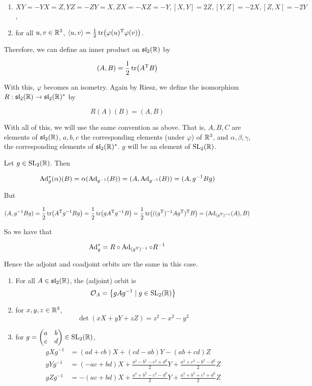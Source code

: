 \documentclass{article}
\renewcommand{\sl}{\mfs\mfl}
\begin{document}
\begin{lemma}
    \begin{enumerate}
        \item \(XY = -YX = Z, YZ = -ZY = X, ZX = -XZ = -Y, [X, Y] = 2Z, [Y, Z] = -2X, [Z, X] = -2Y\),
        \item for all \(u, v\in \mathbb{R}^3\), \(\left\langle u, v \right\rangle = \frac{1}{2}\tr(\varphi(u)^{\mathrm{T}} \varphi(v))\).
    \end{enumerate}
\end{lemma}

Therefore, we can define an inner product on \(\sl_2(\R)\) by

\[(A, B) = \frac{1}{2}\tr(A^{\mathrm{T}} B)\]

With this, \(\varphi\) becomes an isometry. Again by Riesz, we define the isomorphism \(R : \sl_2(\R) \to \sl_2(\R)^*\) by

\[R(A)(B) = (A, B)\]

With all of this, we will use the same convention as above. That is, \(A, B, C\) are elements of \(\sl_2(\R)\), \(a,b, c\) the corresponding elements (under \(\varphi\)) of \(\mathbb{R}^3\), and \(\alpha, \beta, \gamma\), the corresponding elements of \(\sl_2(\R)^*\). \(g\) will be an element of \(\operatorname{SL}_2(\mathbb{R})\).

Let \(g \in \operatorname{SL}_2(\mathbb{R})\). Then

\[\operatorname{Ad}_g^*(\alpha)(B) = \alpha(\operatorname{Ad}_{g^{-1}}(B)) = (A, \operatorname{Ad}_{g^{-1}}(B)) = (A, g^{-1}Bg)\]

But

\[(A, g^{-1}Bg) = \frac{1}{2}\tr(A^{\mathrm{T}} g^{-1}Bg) = \frac{1}{2}\tr(gA^{\mathrm{T}} g^{-1}B) = \frac{1}{2}\tr(((g^{\mathrm{T}})^{-1}Ag^{\mathrm{T}})^{\mathrm{T}} B) = (\operatorname{Ad}_{(g^{\mathrm{T}})^{-1}}(A), B)\]

So we have that

\[\operatorname{Ad}_g^* = R \circ \operatorname{Ad}_{(g^{\mathrm{T}})^{-1}} \circ R^{-1}\]

Hence the adjoint and coadjoint orbits are the same in this case.

\begin{lemma}
    \begin{enumerate}
        \item For all \(A \in \sl_2(\R)\), the (adjoint) orbit is
        \[\mathcal{O}_A = \left\{gAg^{-1} \mid g \in \operatorname{SL}_2(\mathbb{R})\right\}\]
        \item for \(x, y, z \in \mathbb{R}^3\),
        \[\det(xX + yY + zZ) = z^2 - x^2 - y^2\]
        \item for \(g = \begin{pmatrix}
            a & b \\ c & d
        \end{pmatrix} \in \operatorname{SL}_2(\mathbb{R})\),
        \begin{align*}
            gXg^{-1} &= (ad + cb)X + (cd - ab)Y - (ab + cd)Z \\
            gYg^{-1} &= (-ac + bd)X + \frac{a^2 - b^2 - c^2 + d^2}{2}Y + \frac{a^2 + c^2 - b^2 - d^2}{2}Z \\
            gZg^{-1} &= -(ac+bd)X + \frac{a^2 + b^2 - c^2 - d^2}{2}Y + \frac{a^2 + b^2 + c^2 + d^2}{2}Z
        \end{align*}
    \end{enumerate}
\end{lemma}
\end{document}
